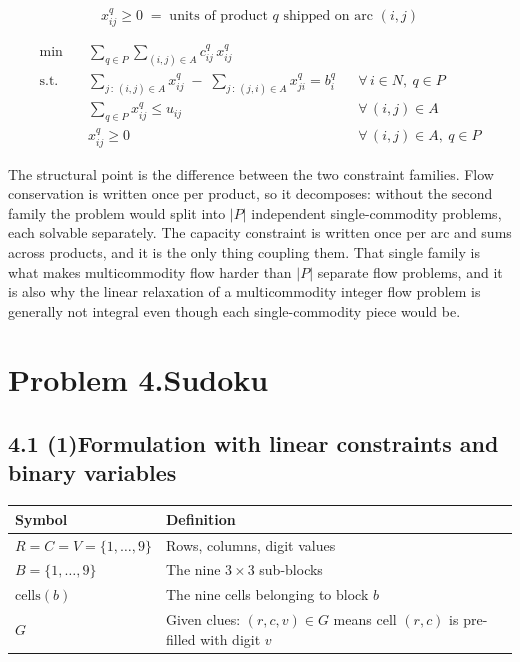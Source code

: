\documentclass[11pt]{article}
\DeclareMathOperator*{\minimize}{min}
\begin{document}
\[
  x_{ij}^{q} \ge 0 \;=\; \text{units of product } q
  \text{ shipped on arc } (i,j)
\]

\begin{align}
  \minimize \quad & \sum_{q \in P} \sum_{(i,j) \in A} c_{ij}^{q}\, x_{ij}^{q} \\[4pt]
  \text{s.t.} \quad
    & \sum_{j \,:\, (i,j) \in A} x_{ij}^{q}
      \;-\; \sum_{j \,:\, (j,i) \in A} x_{ji}^{q} = b_i^{q}
      && \forall\, i \in N,\ q \in P \\[2pt]
    & \sum_{q \in P} x_{ij}^{q} \le u_{ij}
      && \forall\, (i,j) \in A \\[2pt]
    & x_{ij}^{q} \ge 0 && \forall\, (i,j) \in A,\ q \in P
\end{align}

The structural point is the difference between the two constraint
families. Flow conservation is written once per product, so it
decomposes: without the second family the problem would split into
$|P|$ independent single-commodity problems, each solvable separately.
The capacity constraint is written once per arc and sums across
products, and it is the only thing coupling them. That single family is
what makes multicommodity flow harder than $|P|$ separate flow problems,
and it is also why the linear relaxation of a multicommodity integer
flow problem is generally not integral even though each single-commodity
piece would be.

\newpage
\section*{Problem 4.\quad Sudoku \quad[30 pts]}

\subsection*{4.1 (1)\quad Formulation with linear constraints and binary variables}

\begin{center}
\begin{tabular}{@{}ll@{}}
\toprule
Symbol & Definition \\
\midrule
$R = C = V = \{1,\dots,9\}$ & Rows, columns, digit values \\
$B = \{1,\dots,9\}$ & The nine $3 \times 3$ sub-blocks \\
$\mathrm{cells}(b)$ & The nine cells belonging to block $b$ \\
$G$ & Given clues: $(r,c,v) \in G$ means cell $(r,c)$ is pre-filled with digit $v$ \\
\bottomrule
\end{tabular}
\end{center}
\end{document}
